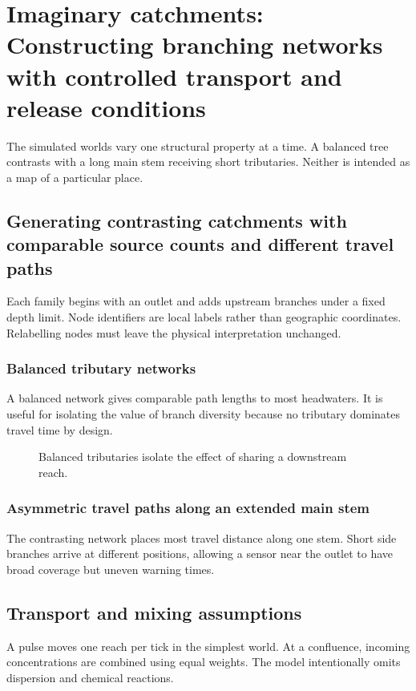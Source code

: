 \chapter{Imaginary catchments: Constructing branching networks with controlled transport and release conditions}\label{demo-worlds}
The simulated worlds vary one structural property at a time. A balanced tree contrasts with a long main stem receiving short tributaries. Neither is intended as a map of a particular place.
\section{Generating contrasting catchments with comparable source counts and different travel paths}\label{demo-worlds-topology}
Each family begins with an outlet and adds upstream branches under a fixed depth limit. Node identifiers are local labels rather than geographic coordinates. Relabelling nodes must leave the physical interpretation unchanged.
\subsection{Balanced tributary networks}\label{demo-worlds-balanced}
A balanced network gives comparable path lengths to most headwaters. It is useful for isolating the value of branch diversity because no tributary dominates travel time by design.
\begin{figure}[htbp]
\centering
{}
\caption{Balanced tributaries isolate the effect of sharing a downstream reach.}\label{demo-fig-balanced}
\end{figure}
\subsection{Asymmetric travel paths along an extended main stem}\label{demo-worlds-stem}
The contrasting network places most travel distance along one stem. Short side branches arrive at different positions, allowing a sensor near the outlet to have broad coverage but uneven warning times.
\section{Transport and mixing assumptions}\label{demo-worlds-transport}
A pulse moves one reach per tick in the simplest world. At a confluence, incoming concentrations are combined using equal weights. The model intentionally omits dispersion and chemical reactions.
